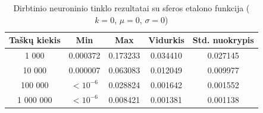 \begin{table}[H]
    \centering
    \begin{tabular}{|c|c|c|c|c|}
        \hline
        \textbf{Taškų kiekis} & \textbf{Min} & \textbf{Max} & \textbf{Vidurkis} & \textbf{Std. nuokrypis} \\ \hline
        1 000        & 0.000372 & 0.173233 & 0.034410 & 0.027145 \\ \hline
        10 000       & 0.000007 & 0.063083 & 0.012049 & 0.009977 \\ \hline
        100 000      & $<10^{-6}$ & 0.028824 & 0.001642 & 0.001552 \\ \hline
        1 000 000    & $<10^{-6}$ & 0.008421 & 0.001381 & 0.001138 \\ \hline
    \end{tabular}
    \caption{Dirbtinio neuroninio tinklo rezultatai su sferos etalono funkcija ($k = 0$, $\mu = 0$, $\sigma = 0$)}
\end{table}
